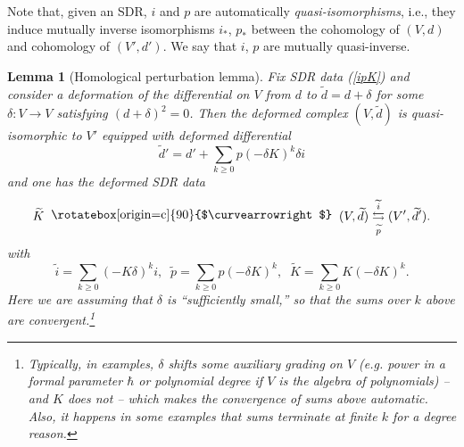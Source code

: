 \documentclass{amsart}
\theoremstyle{plain} %
\newtheorem{lem}[thm]{Lemma}
\theoremstyle{definition}
\theoremstyle{remark}
\newcommand{\ra}{\rightarrow}
\newcommand{\til}{\widetilde}
\newcommand{\SDR}[5]{#5\;\;\raisebox{1.3pt}{\rotatebox[origin=c]{90}{$\curvearrowright$}}\;\; #1 \underset{#4}{\stackrel{#3}{\leftrightarrows}} #2}  %
\begin{document}
Note that, given an SDR, $i$ and $p$ are automatically \emph{quasi-isomorphisms}, i.e., they induce mutually inverse isomorphisms $i_*$, $p_*$ between the cohomology of $(V,d)$ and cohomology of $(V',d')$. We say that $i$, $p$ are mutually quasi-inverse.

\begin{lem}[Homological perturbation lemma]\label{lemma: HPL}
    Fix SDR data (\ref{ipK}) and consider a deformation of the differential on $V$ from $d$ to $\til{d}=d+\delta$ for some $\delta\colon V\ra V$ satisfying $(d+\delta)^2=0$. Then the deformed complex
    $(V,\til{d})$ is quasi-isomorphic to $V'$ equipped with
    deformed differential
    \begin{equation}\label{HPL tilde d'}
        \til{d}'=d'+\sum_{k\geq 0}p(-\delta K)^k\delta i
    \end{equation}
    and one has the deformed SDR data
    \begin{equation}
  \SDR{(V,\til{d})}{(V',\til{d}')}{\til{i}}{\til{p}}{\til{K}}.
    \end{equation}
    with
    \begin{equation}\label{HPL tilde ipK}
        \til{i}= \sum_{k\geq 0}(-K\delta)^k i,\;\;
        \til{p}= \sum_{k\geq 0}p(-\delta K)^k,\;\;
        \til{K}= \sum_{k\geq 0} K(-\delta K)^k.
    \end{equation}
    Here we are assuming that $\delta$ is ``sufficiently small,'' so that the sums over $k$ above are convergent.\footnote{Typically, in examples, $\delta$ shifts some auxiliary grading on $V$ (e.g. power in a formal parameter $\hbar$ or polynomial degree if $V$ is the algebra of polynomials) -- and $K$ does not -- which makes the convergence of sums above automatic. Also, it happens in some examples that sums terminate at finite $k$ for a degree reason.}
\end{lem}


\end{document}
